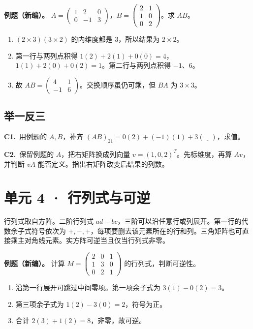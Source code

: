 \documentclass[UTF8,a4paper,11pt]{ctexart}
\newcommand{\CompactQuestion}[2]{\par\noindent\textbf{#1.}\ #2\par\vspace{.8em}}
\begin{document}
\textbf{例题（新编）。} $A=\begin{pmatrix}1&2&0\\0&-1&3\end{pmatrix}$，$B=\begin{pmatrix}2&1\\1&0\\0&2\end{pmatrix}$。求 $AB$。

\begin{enumerate}
\item $(2\times3)(3\times2)$ 的内维度都是 3，所以结果为 $2\times2$。
\item 第一行与两列点积得 $1(2)+2(1)+0(0)=4$，$1(1)+2(0)+0(2)=1$。第二行与两列点积得 $-1$、$6$。
\item 故 $AB=\begin{pmatrix}4&1\\-1&6\end{pmatrix}$。交换顺序虽仍可乘，但 $BA$ 为 $3\times3$。
\end{enumerate}
\subsection{举一反三}
\CompactQuestion{C1}{用例题的 $A,B$，补齐 $(AB)_{21}=0(2)+(-1)(1)+3(\underline{\quad})$，求值。}
\CompactQuestion{C2}{保留例题的 $A$，把右矩阵换成列向量 $v=(1,0,2)^T$。先标维度，再算 $Av$，并判断 $vA$ 能否定义。指出右矩阵改变后结果的列数。}
\clearpage
\section{单元 4 · 行列式与可逆}
行列式取自方阵。二阶行列式 $ad-bc$，三阶可以沿任意行或列展开。第一行的代数余子式符号依次为 $+,-,+$，每项要删去该元素所在的行和列。三角矩阵也可直接乘主对角线元素。实方阵可逆当且仅当行列式非零。

\textbf{例题（新编）。} 计算 $M=\begin{pmatrix}2&0&1\\1&3&0\\0&2&1\end{pmatrix}$ 的行列式，判断可逆性。

\begin{enumerate}
\item 沿第一行展开可跳过中间零项。第一项余子式为 $3(1)-0(2)=3$。
\item 第三项余子式为 $1(2)-3(0)=2$，符号为正。
\item 合计 $2(3)+1(2)=8$，非零，故可逆。
\end{enumerate}
\end{document}
